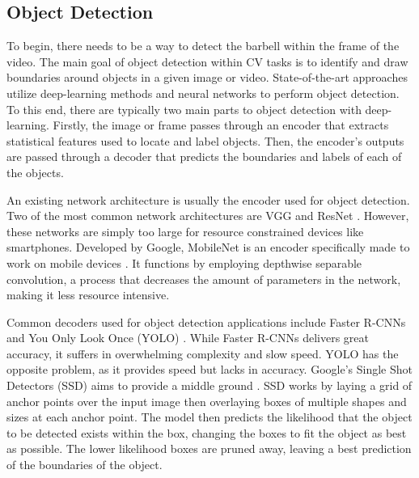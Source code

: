 \documentclass[10pt,twocolumn]{article}
\begin{document}
\subsection{Object Detection}
To begin, there needs to be a way to detect the barbell within the frame of the video.
The main goal of object detection within CV tasks is to identify and draw boundaries around objects in a given image or video.
State-of-the-art approaches utilize deep-learning methods and neural networks to perform object detection. 
To this end, there are typically two main parts to object detection with deep-learning.
Firstly, the image or frame passes through an encoder that extracts statistical features used to locate and label objects.
Then, the encoder's outputs are passed through a decoder that predicts the boundaries and labels of each of the objects. \par

An existing network architecture is usually the encoder used for object detection.
Two of the most common network architectures are VGG and ResNet \cite{Simonyan2015,He2016}.
However, these networks are simply too large for resource constrained devices like smartphones.
Developed by Google, MobileNet is an encoder specifically made to work on mobile devices \cite{Howard2017}.
It functions by employing depthwise separable convolution, a process that decreases the amount of parameters in the network, making it less resource intensive. \par

Common decoders used for object detection applications include Faster R-CNNs and You Only Look Once (YOLO) \cite{Ren2015,Redmon2015}.
While Faster R-CNNs delivers great accuracy, it suffers in overwhelming complexity and slow speed.
YOLO has the opposite problem, as it provides speed but lacks in accuracy.
Google's Single Shot Detectors (SSD) aims to provide a middle ground \cite{Liu2015}.
SSD works by laying a grid of anchor points over the input image then overlaying boxes of multiple shapes and sizes at each anchor point.
The model then predicts the likelihood that the object to be detected exists within the box, changing the boxes to fit the object as best as possible.
The lower likelihood boxes are pruned away, leaving a best prediction of the boundaries of the object. \par
\end{document}
